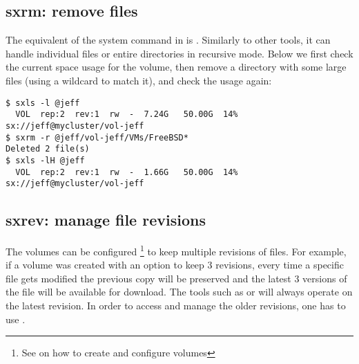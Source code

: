 \subsection{sxrm: remove files}
The equivalent of the system command  in \SX is . Similarly
to other tools, it can handle individual files or entire directories in
recursive mode. Below we first check the current space usage for the volume, then
remove a directory with some large files (using a wildcard to match it), and check
the usage again:
\begin{lstlisting}
$ sxls -l @jeff
  VOL  rep:2  rev:1  rw  -  7.24G   50.00G  14% sx://jeff@mycluster/vol-jeff
$ sxrm -r @jeff/vol-jeff/VMs/FreeBSD*
Deleted 2 file(s)
$ sxls -lH @jeff
  VOL  rep:2  rev:1  rw  -  1.66G   50.00G  14% sx://jeff@mycluster/vol-jeff
\end{lstlisting}

\subsection{sxrev: manage file revisions}
The \SX volumes can be configured \footnote{See  on how
to create and configure volumes} to keep multiple revisions of files. For
example, if a volume was created with an option to keep 3 revisions, every
time a specific file gets modified the previous copy will be preserved and
the latest 3 versions of the file will be available for download. The tools
such as  or  will always operate on the latest revision.
In order to access and manage the older revisions, one has to use .

